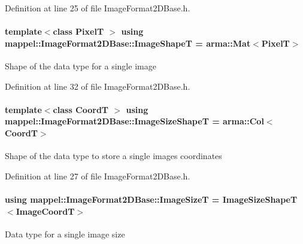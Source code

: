 Definition at line 25 of file Image\+Format2\+D\+Base.\+h.

\paragraph[{\texorpdfstring{Image\+ShapeT}{ImageShapeT}}]{\setlength{\rightskip}{0pt plus 5cm}template$<$class PixelT $>$ using {\bf mappel\+::\+Image\+Format2\+D\+Base\+::\+Image\+ShapeT} =  arma\+::\+Mat$<$PixelT$>$}\hypertarget{classmappel_1_1ImageFormat2DBase_ac40fc3773b5668601c63905876cca732}{}\label{classmappel_1_1ImageFormat2DBase_ac40fc3773b5668601c63905876cca732}
Shape of the data type for a single image 

Definition at line 32 of file Image\+Format2\+D\+Base.\+h.

\paragraph[{\texorpdfstring{Image\+Size\+ShapeT}{ImageSizeShapeT}}]{\setlength{\rightskip}{0pt plus 5cm}template$<$class CoordT $>$ using {\bf mappel\+::\+Image\+Format2\+D\+Base\+::\+Image\+Size\+ShapeT} =  arma\+::\+Col$<$CoordT$>$}\hypertarget{classmappel_1_1ImageFormat2DBase_a23c1a9e9f1482852aa0cf4951efe7c48}{}\label{classmappel_1_1ImageFormat2DBase_a23c1a9e9f1482852aa0cf4951efe7c48}
Shape of the data type to store a single image\textquotesingle{}s coordinates 

Definition at line 27 of file Image\+Format2\+D\+Base.\+h.

\paragraph[{\texorpdfstring{Image\+SizeT}{ImageSizeT}}]{\setlength{\rightskip}{0pt plus 5cm}using {\bf mappel\+::\+Image\+Format2\+D\+Base\+::\+Image\+SizeT} =  {\bf Image\+Size\+ShapeT}$<${\bf Image\+CoordT}$>$}\hypertarget{classmappel_1_1ImageFormat2DBase_a49cccf61eb2a768a202634d27fcd81d5}{}\label{classmappel_1_1ImageFormat2DBase_a49cccf61eb2a768a202634d27fcd81d5}
Data type for a single image size 

